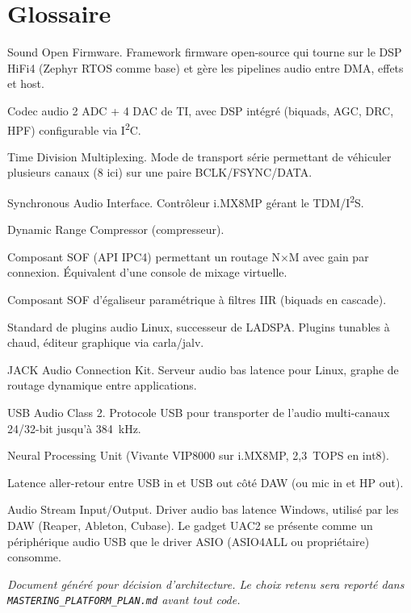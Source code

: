 \documentclass[11pt,a4paper]{article}
\begin{document}
\clearpage
\section{Glossaire}

\begin{description}[leftmargin=2.5cm, style=nextline]
\item[SOF] Sound Open Firmware. Framework firmware open-source qui tourne sur le DSP HiFi4 (Zephyr RTOS comme base) et gère les pipelines audio entre DMA, effets et host.
\item[TAC5212] Codec audio 2 ADC + 4 DAC de TI, avec DSP intégré (biquads, AGC, DRC, HPF) configurable via I\textsuperscript{2}C.
\item[TDM] Time Division Multiplexing. Mode de transport série permettant de véhiculer plusieurs canaux (8 ici) sur une paire BCLK/FSYNC/DATA.
\item[SAI] Synchronous Audio Interface. Contrôleur i.MX8MP gérant le TDM/I\textsuperscript{2}S.
\item[DRC] Dynamic Range Compressor (compresseur).
\item[mixin\_mixout] Composant SOF (API IPC4) permettant un routage N$\times$M avec gain par connexion. Équivalent d'une console de mixage virtuelle.
\item[eq\_iir] Composant SOF d'égaliseur paramétrique à filtres IIR (biquads en cascade).
\item[LV2] Standard de plugins audio Linux, successeur de LADSPA. Plugins tunables à chaud, éditeur graphique via carla/jalv.
\item[JACK] JACK Audio Connection Kit. Serveur audio bas latence pour Linux, graphe de routage dynamique entre applications.
\item[UAC2] USB Audio Class 2. Protocole USB pour transporter de l'audio multi-canaux 24/32-bit jusqu'à 384~kHz.
\item[NPU] Neural Processing Unit (Vivante VIP8000 sur i.MX8MP, 2{,}3~TOPS en int8).
\item[Round-trip latency / RTT] Latence aller-retour entre USB in et USB out côté DAW (ou mic in et HP out).
\item[ASIO] Audio Stream Input/Output. Driver audio bas latence Windows, utilisé par les DAW (Reaper, Ableton, Cubase). Le gadget UAC2 se présente comme un périphérique audio USB que le driver ASIO (ASIO4ALL ou propriétaire) consomme.
\end{description}

\vfill
\begin{center}
\textit{Document généré pour décision d'architecture. Le choix retenu sera reporté dans \texttt{MASTERING\_PLATFORM\_PLAN.md} avant tout code.}
\end{center}
\end{document}
